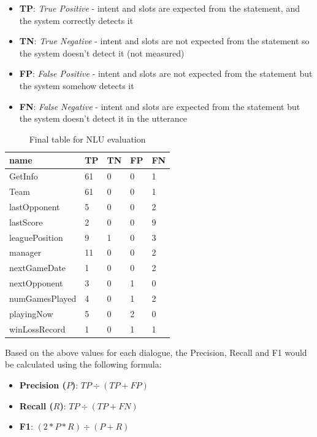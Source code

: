 \documentclass[10pt,a4paper,twocolumn]{article}
\begin{document}
\begin{itemize}
    \setlength\itemsep{0em}
    \item \textbf{TP}: \textit{True Positive} - intent and slots are expected from the statement, and the system correctly detects it
    \item \textbf{TN}: \textit{True Negative} - intent and slots are not expected from the statement so the system doesn't detect it (not measured)
    \item \textbf{FP}: \textit{False Positive} - intent and slots are not expected from the statement but the system somehow detects it
    \item \textbf{FN}: \textit{False Negative} - intent and slots are expected from the statement but the system doesn't detect it in the utterance
\end{itemize}

\begin{table}[h]
\centering
\begin{tabular}{lllll}
\hline
name           & TP & TN & FP & FN \\ \hline
GetInfo        & 61 & 0  & 0  & 1  \\
Team           & 61 & 0  & 0  & 1  \\
lastOpponent   & 5  & 0  & 0  & 2  \\
lastScore      & 2  & 0  & 0  & 9  \\
leaguePosition & 9  & 1  & 0  & 3  \\
manager        & 11 & 0  & 0  & 2  \\
nextGameDate   & 1  & 0  & 0  & 2  \\
nextOpponent   & 3  & 0  & 1  & 0  \\
numGamesPlayed & 4  & 0  & 1  & 2  \\
playingNow     & 5  & 0  & 2  & 0  \\
winLossRecord  & 1  & 0  & 1  & 1  \\ \hline
\end{tabular}
\caption*{Final table for NLU evaluation}
\end{table}

Based on the above values for each dialogue, the Precision, Recall and F1 would be calculated using the following formula:

\begin{itemize}
    \setlength\itemsep{0em}
    \item \textbf{Precision ($P$)}: $TP \div (TP + FP)$
    \item \textbf{Recall ($R$)}: $TP \div (TP + FN)$
    \item \textbf{F1}: $(2 * P * R) \div (P + R)$
\end{itemize}
\end{document}
